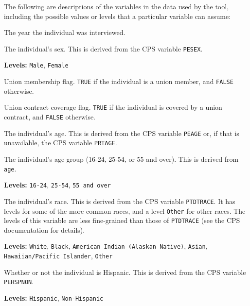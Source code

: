 \documentclass[letterpaper,12pt]{article}
\begin{document}
The following are descriptions of the variables in the data used by
the tool, including the possible values or levels that a particular
variable can assume:
\begin{description}[style=multiline,leftmargin=3cm,font=\normalfont]
\item[\texttt{year}] The year the individual was interviewed.

\item[\texttt{sex}] The individual's sex. This is derived from the CPS
  variable \texttt{PESEX}.

  \textbf{Levels:} \texttt{Male}, \texttt{Female}

\item[\texttt{member}] Union membership flag. \texttt{TRUE} if the
  individual is a union member, and \texttt{FALSE} otherwise.

\item[\texttt{covered}] Union contract coverage flag. \texttt{TRUE} if
  the individual is covered by a union contract, and \texttt{FALSE}
  otherwise.

\item[\texttt{age}] The individual's age. This is derived from the CPS
  variable \texttt{PEAGE} or, if that is unavailable, the CPS variable
  \texttt{PRTAGE}.

\item[\texttt{age\_group}] The individual's age group (16-24, 25-54,
  or 55 and over). This is derived from \texttt{age}.

  \textbf{Levels:} \texttt{16-24}, \texttt{25-54}, \texttt{55 and
    over}

\item[\texttt{race}] The individual's race. This is derived from the
  CPS variable \texttt{PTDTRACE}. It has levels for some of the more
  common races, and a level \texttt{Other} for other races. The levels
  of this variable are less fine-grained than those of
  \texttt{PTDTRACE} (see the CPS documentation for details).

  \textbf{Levels:} \texttt{White}, \texttt{Black}, \texttt{American
    Indian (Alaskan Native)}, \texttt{Asian}, \texttt{Hawaiian/Pacific
    Islander}, \texttt{Other}

\item[\texttt{hisp}] Whether or not the individual is Hispanic. This
  is derived from the CPS variable \texttt{PEHSPNON}.

  \textbf{Levels:} \texttt{Hispanic}, \texttt{Non-Hispanic}


\end{description}
\end{document}
